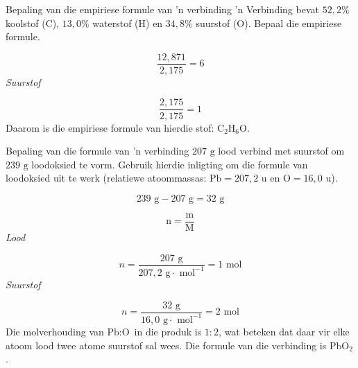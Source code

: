 \begin{wex}{Bepaling van die empiriese formule van 'n verbinding}{
 'n Verbinding bevat $52,2\%$ koolstof ($\text{C}$), $13,0\%$ waterstof ($\text{H}$) en $34,8\%$ suurstof ($\text{O}$). Bepaal die empiriese formule.      
}
{      \label{m38712*id281223}\nopagebreak\noindent{}
        
    \begin{equation*}
    \frac{12,871}{2,175}=6
      \end{equation*}
      \label{m38712*id281254}
        \textsl{Suurstof}
      
      \label{m38712*id281261}\nopagebreak\noindent{}
        
    \begin{equation*}
    \frac{2,175}{2,175}=1
      \end{equation*}
      \label{m38712*id281292}Daarom is die empiriese formule van hierdie stof: ${\text{C}}_{2}{\text{H}}_{6}\text{O}$.
}
    \end{wex}
    \noindent
\label{m38712*secfhsst!!!underscore!!!id1235}
      \noindent
      \begin{wex}{Bepaling van die formule van 'n verbinding}{
$207 \text{ g}$ lood verbind met suurstof om $239 \text{ g}$ loodoksied te vorm. Gebruik hierdie inligting om
    die formule van loodoksied uit te werk (relatiewe atoommassas: $\text{Pb}=207,2 \text{ u}$ en $\text{O} = 16,0 \text{ u}$).
}
{
      \label{m38712*id281379}\nopagebreak\noindent{}
    \begin{equation*}
    239 \text{ g}-207 \text{ g}=32 \text{ g}
      \end{equation*}
      \label{m38712*id281407}\nopagebreak\noindent{}
        
    \begin{equation*}
    \text{n}=\frac{\text{m}}{\text{M}}
      \end{equation*}
      \label{m38712*id281427}
        \textsl{Lood}
       
      \label{m38712*id281433}\nopagebreak\noindent{}
        
    \begin{equation*}
    n = \frac{207 \text{ g}}{207,2 \text{ g} \cdot \text{ mol}^{-1}}=1 \text{ mol}
      \end{equation*}
      \label{m38712*id281460}
        \textsl{Suurstof}
    
      \label{m38712*id281467}\nopagebreak\noindent{}
        
    \begin{equation*}
    n= \frac{32 \text{ g}}{16,0 \text{ g} \cdot \text{ mol}^{-1}}=2 \text{ mol}
      \end{equation*}
      \label{m38712*id281498}Die molverhouding van $\text{Pb}:\text{O}$ in die produk is $1:2$, wat beteken dat daar vir elke atoom lood twee atome suurstof sal wees. Die formule van die verbinding is $\text{PbO}{}_{2}$. 
}
    \end{wex}
